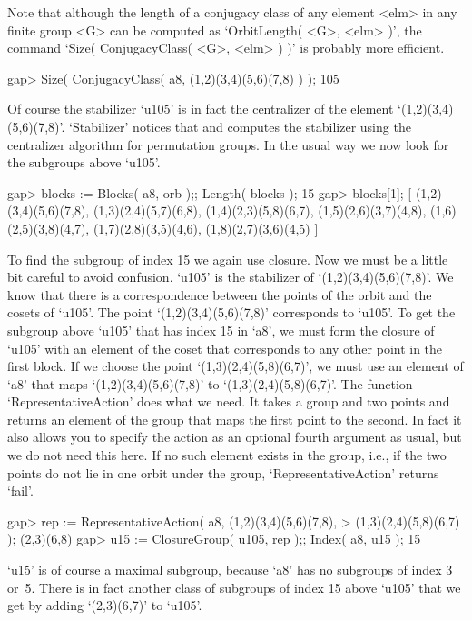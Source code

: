 Note that although the length of a conjugacy class of any element <elm>
in any finite group <G> can be computed as `OrbitLength( <G>, <elm> )',
the command `Size( ConjugacyClass( <G>, <elm> ) )' is probably more
efficient.

\beginexample
gap> Size( ConjugacyClass( a8, (1,2)(3,4)(5,6)(7,8) ) );
105
\endexample

Of course the stabilizer `u105' is in fact the centralizer of the element
`(1,2)(3,4)(5,6)(7,8)'.  `Stabilizer' notices    that and computes    the
stabilizer using the centralizer algorithm for permutation groups. In the
usual way we now look for the subgroups above `u105'.

\beginexample
gap> blocks := Blocks( a8, orb );; Length( blocks );
15
gap> blocks[1];
[ (1,2)(3,4)(5,6)(7,8), (1,3)(2,4)(5,7)(6,8), (1,4)(2,3)(5,8)(6,7), 
  (1,5)(2,6)(3,7)(4,8), (1,6)(2,5)(3,8)(4,7), (1,7)(2,8)(3,5)(4,6), 
  (1,8)(2,7)(3,6)(4,5) ]
\endexample

To find the subgroup of index 15 we  again use closure. Now  we must be a
little bit  careful to avoid    confusion. `u105' is the  stabilizer   of
`(1,2)(3,4)(5,6)(7,8)'. We  know  that there is  a correspondence between
the  points  of  the   orbit and  the   cosets  of  `u105'.   The   point
`(1,2)(3,4)(5,6)(7,8)' corresponds   to `u105'.
To get the subgroup above `u105' that has index 15 in `a8',
we must form the closure of `u105' with an element of the coset that
corresponds to any other point in the first block.
If we choose the point `(1,3)(2,4)(5,8)(6,7)',
we must use an element of `a8' that maps `(1,2)(3,4)(5,6)(7,8)' to
`(1,3)(2,4)(5,8)(6,7)'.
The function `RepresentativeAction' does what we need.
It takes a group and two points and returns an element of the group
that maps the first point to the second.
In fact it also allows you to specify the action as an optional fourth
argument as usual, but we do not need this here.
If no such element exists in the  group, i.e., if the two points do not
lie in one orbit under the group,
`RepresentativeAction' returns `fail'.

\beginexample
gap> rep := RepresentativeAction( a8, (1,2)(3,4)(5,6)(7,8),
>                                        (1,3)(2,4)(5,8)(6,7) );
(2,3)(6,8)
gap> u15 := ClosureGroup( u105, rep );; Index( a8, u15 );
15
\endexample

`u15' is of course a maximal  subgroup, because `a8'  has no subgroups of
index 3 or~5.  There is in fact  another  class of subgroups  of index 15
above `u105' that we get by adding `(2,3)(6,7)' to `u105'.

